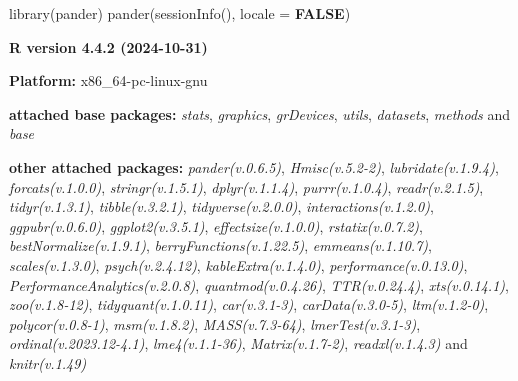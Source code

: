 \documentclass[
  bookmarksnumbered]{article}
\newenvironment{Shaded}{\begin{snugshade}}{\end{snugshade}}
\newcommand{\AttributeTok}[1]{\textcolor[rgb]{0.80,0.80,0.80}{#1}}
\newcommand{\ConstantTok}[1]{\textcolor[rgb]{0.86,0.64,0.64}{\textbf{#1}}}
\newcommand{\FunctionTok}[1]{\textcolor[rgb]{0.94,0.94,0.56}{#1}}
\newcommand{\NormalTok}[1]{\textcolor[rgb]{0.80,0.80,0.80}{#1}}
\begin{document}
\begin{Shaded}
\begin{Highlighting}[]
\FunctionTok{library}\NormalTok{(pander)}
\FunctionTok{pander}\NormalTok{(}\FunctionTok{sessionInfo}\NormalTok{(), }\AttributeTok{locale =} \ConstantTok{FALSE}\NormalTok{)}
\end{Highlighting}
\end{Shaded}

\textbf{R version 4.4.2 (2024-10-31)}

\textbf{Platform:} x86\_64-pc-linux-gnu

\textbf{attached base packages:}
\emph{stats}, \emph{graphics}, \emph{grDevices}, \emph{utils}, \emph{datasets}, \emph{methods} and \emph{base}

\textbf{other attached packages:}
\emph{pander(v.0.6.5)}, \emph{Hmisc(v.5.2-2)}, \emph{lubridate(v.1.9.4)}, \emph{forcats(v.1.0.0)}, \emph{stringr(v.1.5.1)}, \emph{dplyr(v.1.1.4)}, \emph{purrr(v.1.0.4)}, \emph{readr(v.2.1.5)}, \emph{tidyr(v.1.3.1)}, \emph{tibble(v.3.2.1)}, \emph{tidyverse(v.2.0.0)}, \emph{interactions(v.1.2.0)}, \emph{ggpubr(v.0.6.0)}, \emph{ggplot2(v.3.5.1)}, \emph{effectsize(v.1.0.0)}, \emph{rstatix(v.0.7.2)}, \emph{bestNormalize(v.1.9.1)}, \emph{berryFunctions(v.1.22.5)}, \emph{emmeans(v.1.10.7)}, \emph{scales(v.1.3.0)}, \emph{psych(v.2.4.12)}, \emph{kableExtra(v.1.4.0)}, \emph{performance(v.0.13.0)}, \emph{PerformanceAnalytics(v.2.0.8)}, \emph{quantmod(v.0.4.26)}, \emph{TTR(v.0.24.4)}, \emph{xts(v.0.14.1)}, \emph{zoo(v.1.8-12)}, \emph{tidyquant(v.1.0.11)}, \emph{car(v.3.1-3)}, \emph{carData(v.3.0-5)}, \emph{ltm(v.1.2-0)}, \emph{polycor(v.0.8-1)}, \emph{msm(v.1.8.2)}, \emph{MASS(v.7.3-64)}, \emph{lmerTest(v.3.1-3)}, \emph{ordinal(v.2023.12-4.1)}, \emph{lme4(v.1.1-36)}, \emph{Matrix(v.1.7-2)}, \emph{readxl(v.1.4.3)} and \emph{knitr(v.1.49)}
\end{document}
